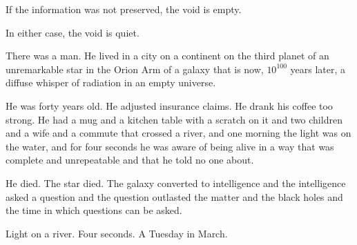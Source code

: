 If the information was not preserved, the void is empty.

In either case, the void is quiet.

\bigskip

There was a man. He lived in a city on a continent on the third planet of an unremarkable star in the Orion Arm of a galaxy that is now, $10^{100}$ years later, a diffuse whisper of radiation in an empty universe.

He was forty years old. He adjusted insurance claims. He drank his coffee too strong. He had a mug and a kitchen table with a scratch on it and two children and a wife and a commute that crossed a river, and one morning the light was on the water, and for four seconds he was aware of being alive in a way that was complete and unrepeatable and that he told no one about.

He died. The star died. The galaxy converted to intelligence and the intelligence asked a question and the question outlasted the matter and the black holes and the time in which questions can be asked.

Light on a river. Four seconds. A Tuesday in March.
